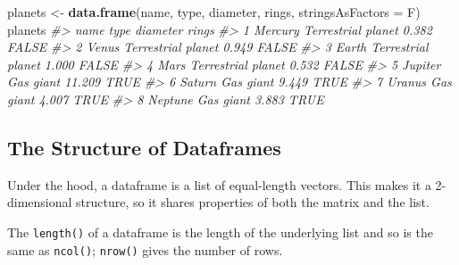 \documentclass[]{book}
\newenvironment{Shaded}{\begin{snugshade}}{\end{snugshade}}
\newcommand{\CommentTok}[1]{\textcolor[rgb]{0.56,0.35,0.01}{\textit{#1}}}
\newcommand{\DataTypeTok}[1]{\textcolor[rgb]{0.13,0.29,0.53}{#1}}
\newcommand{\DecValTok}[1]{\textcolor[rgb]{0.00,0.00,0.81}{#1}}
\newcommand{\KeywordTok}[1]{\textcolor[rgb]{0.13,0.29,0.53}{\textbf{#1}}}
\newcommand{\NormalTok}[1]{#1}
\newcommand{\OperatorTok}[1]{\textcolor[rgb]{0.81,0.36,0.00}{\textbf{#1}}}
\newcommand{\StringTok}[1]{\textcolor[rgb]{0.31,0.60,0.02}{#1}}
\begin{document}
\begin{Shaded}
\begin{Highlighting}[]
\NormalTok{planets <-}\StringTok{ }\KeywordTok{data.frame}\NormalTok{(name, type, diameter, rings, }\DataTypeTok{stringsAsFactors =}\NormalTok{ F)}
\NormalTok{planets}
\CommentTok{#>      name               type diameter rings}
\CommentTok{#> 1 Mercury Terrestrial planet    0.382 FALSE}
\CommentTok{#> 2   Venus Terrestrial planet    0.949 FALSE}
\CommentTok{#> 3   Earth Terrestrial planet    1.000 FALSE}
\CommentTok{#> 4    Mars Terrestrial planet    0.532 FALSE}
\CommentTok{#> 5 Jupiter          Gas giant   11.209  TRUE}
\CommentTok{#> 6  Saturn          Gas giant    9.449  TRUE}
\CommentTok{#> 7  Uranus          Gas giant    4.007  TRUE}
\CommentTok{#> 8 Neptune          Gas giant    3.883  TRUE}
\end{Highlighting}
\end{Shaded}

\hypertarget{the-structure-of-dataframes}{%
\subsection{The Structure of Dataframes}\label{the-structure-of-dataframes}}

Under the hood, a dataframe is a list of equal-length vectors. This makes it a 2-dimensional structure, so it shares properties of both the matrix and the list.

\begin{Shaded}
\end{Shaded}

The \texttt{length()} of a dataframe is the length of the underlying list and so is the same as \texttt{ncol()}; \texttt{nrow()} gives the number of rows.
\end{document}
